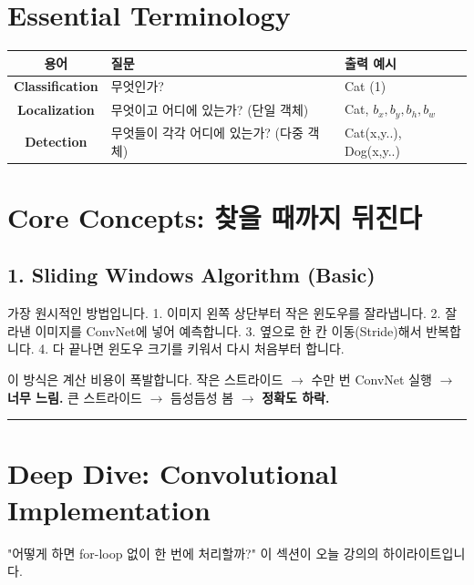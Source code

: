 \documentclass[11pt,a4paper]{book}
\theoremstyle{definition}
\begin{document}
\section{Essential Terminology}
\begin{center}
\begin{tabular}{|c|l|l|}
\hline
\textbf{용어} & \textbf{질문} & \textbf{출력 예시} \\ \hline
\textbf{Classification} & 무엇인가? & Cat (1) \\ \hline
\textbf{Localization} & 무엇이고 어디에 있는가? (단일 객체) & Cat, $b_x, b_y, b_h, b_w$ \\ \hline
\textbf{Detection} & 무엇들이 각각 어디에 있는가? (다중 객체) & Cat(x,y..), Dog(x,y..) \\ \hline
\end{tabular}
\end{center}

\section{Core Concepts: 찾을 때까지 뒤진다}

\subsection{1. Sliding Windows Algorithm (Basic)}


가장 원시적인 방법입니다.
1. 이미지 왼쪽 상단부터 작은 윈도우를 잘라냅니다.
2. 잘라낸 이미지를 ConvNet에 넣어 예측합니다.
3. 옆으로 한 칸 이동(Stride)해서 반복합니다.
4. 다 끝나면 윈도우 크기를 키워서 다시 처음부터 합니다.

\begin{warningbox}[title={치명적 단점: 속도}]
이 방식은 계산 비용이 폭발합니다.
작은 스트라이드 $\rightarrow$ 수만 번 ConvNet 실행 $\rightarrow$ \textbf{너무 느림.}
큰 스트라이드 $\rightarrow$ 듬성듬성 봄 $\rightarrow$ \textbf{정확도 하락.}
\end{warningbox}

\vspace{0.5cm}\hrule\vspace{0.5cm}

\section{Deep Dive: Convolutional Implementation}

"어떻게 하면 for-loop 없이 한 번에 처리할까?"
이 섹션이 오늘 강의의 하이라이트입니다.
\end{document}
